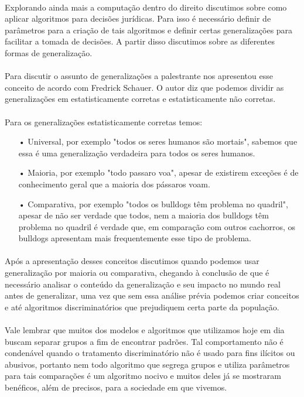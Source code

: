 \documentclass[12pt]{article}
\begin{document}
	\paragraph{}
		Explorando ainda mais a computação dentro do direito discutimos
		sobre como aplicar algoritmos para decisões jurídicas. Para isso
		é necessário definir de parâmetros para a criação de tais 
		algoritmos e definir certas generalizações para facilitar a
		tomada de decisões. A partir disso discutimos sobre as diferentes 
		formas de generalização.
	\paragraph{}
		Para discutir o assunto de generalizações a palestrante nos apresentou
		esse conceito de acordo com Fredrick Schauer. O autor diz que podemos 
		dividir as generalizações em estatisticamente corretas e estatisticamente
		não corretas.
	\paragraph{}
		Para os generalizações estatisticamente corretas temos:
		\begin{itemize}
			\item[•]		
				Universal, por exemplo "todos os seres humanos são mortais", sabemos
				que essa é uma generalização verdadeira para todos os seres humanos.
			\item[•]	
				Maioria, por exemplo "todo passaro voa", apesar de existirem exceções
				é de conhecimento geral que a maioria dos pássaros voam.
			\item[•]	
				Comparativa, por exemplo "todos os bulldogs têm problema no quadril",
				apesar de não ser verdade que todos, nem a maioria dos bulldogs têm
				problema no quadril é verdade que, em comparação com outros 
				cachorros,	os bulldogs apresentam mais frequentemente esse tipo
				de problema.
		\end{itemize}
	\paragraph{}
		Após a apresentação desses conceitos discutimos	quando podemos usar
		generalização por maioria ou comparativa, chegando à conclusão de que
		é necessário analisar o conteúdo da generalização e seu impacto no mundo 
		real antes de generalizar, uma vez que sem essa análise prévia podemos
		criar conceitos e até algoritmos discriminatórios que prejudiquem certa
		parte da população.
	\paragraph{}
		Vale lembrar que muitos dos modelos e algoritmos que utilizamos hoje em dia 
		buscam separar grupos a fim de encontrar padrões. Tal comportamento
		não é condenável quando o tratamento discriminatório não é usado
		para fins ilícitos ou abusivos, portanto nem todo algoritmo que
		segrega grupos e utiliza parâmetros para tais comparações é
		um algoritmo nocivo e muitos deles já se mostraram benéficos, além
		de precisos, para a sociedade em que vivemos.
\end{document}
